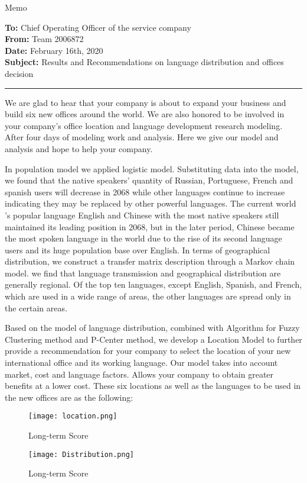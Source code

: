 \documentclass[12pt]{article}  %
\begin{document}
\begin{letter}{Memo}
	\begin{flushleft}  %
		\textbf{To:} Chief Operating Officer of the service company\\
		\textbf{From:} Team 2006872\\
		\textbf{Date:} February 16th, 2020\\
		\textbf{Subject:} Results and Recommendations on language distribution and offices decision
		\rule{\textwidth}{0.15mm} 
	\end{flushleft}
	We are glad to hear that your company is about to expand your business and build six new offices around the world. We are also honored to be involved in your company's office location and language development research modeling. After four days of modeling work and analysis. Here we give our model and analysis and hope to help your company.
	
	In population model we applied logistic model. Substituting data into the model, we found that the native speakers' quantity of Russian, Portuguese, French and spanish users will decrease in 2068 while other languages continue to increase indicating they may be replaced by other powerful languages. The current world ’s popular language English and Chinese with the most native speakers still maintained its leading position in 2068, but in the later period, Chinese became the most spoken language in the world due to the rise of its second language users and its huge population base over English. In terms of geographical distribution, we construct a transfer matrix description through a Markov chain model. we find that language transmission and geographical distribution are generally regional. Of the top ten languages, except English, Spanish, and French, which are used in a wide range of areas, the other languages are spread only in the certain areas.
	
	Based on the model of language distribution, combined with Algorithm for Fuzzy Clustering method and P-Center method, we develop a Location Model to further provide a recommendation for your company to select the location of your new international office and its working language. Our model takes into account market, cost and language factors. Allows your company to obtain greater benefits at a lower cost. These six locations as well as the languages to be used in the new offices are as the following:
	\begin{figure}[H]
		\centering
		\texttt{[image: location.png]}
		\caption{Long-term Score}\label{fig:location.png}
	\end{figure}
\begin{figure}[H]
	\centering
	\texttt{[image: Distribution.png]}
	\caption{Long-term Score}\label{fig:Distribution.png}
\end{figure}
	

\end{letter}
\end{document}
